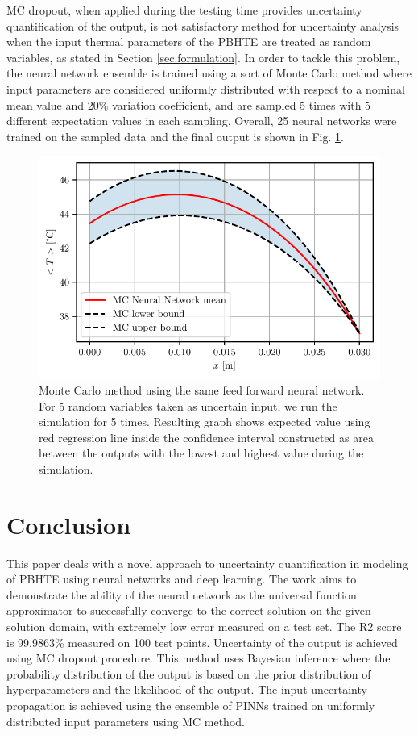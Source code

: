 \documentclass[conference]{IEEEtran}
\begin{document}
MC dropout, when applied during the testing time provides uncertainty quantification of the output, is not satisfactory method for uncertainty analysis when the input thermal parameters of the PBHTE are treated as random variables, as stated in Section \ref{sec.formulation}. In order to tackle this problem, the neural network ensemble is trained using a sort of Monte Carlo method where input parameters are considered uniformly distributed with respect to a nominal mean value and 20\% variation coefficient, and are sampled 5 times with 5 different expectation values in each sampling. Overall, 25 neural networks were trained on the sampled data and the final output is shown in Fig. \ref{fig.ensamble}.
\begin{figure}[]
\centering
 \includegraphics[width=\linewidth]{figs/uncertainty-mcnn-5epochs5samples.pdf}
\caption{Monte Carlo method using the same feed forward neural network. For 5 random variables taken as uncertain input, we run the simulation for 5 times. Resulting graph shows expected value using red regression line inside the confidence interval constructed as area between the outputs with the lowest and highest value during the simulation.}
\label{fig.ensamble}
\end{figure}

\section{Conclusion}
\label{sec.conclusion}
This paper deals with a novel approach to uncertainty quantification in modeling of PBHTE using neural networks and deep learning. The work aims to demonstrate the ability of the neural network as the universal function approximator to successfully converge to the correct solution on the given solution domain, with extremely low error measured on a test set. The R2 score is 99.9863\% measured on 100 test points. Uncertainty of the output is achieved using MC dropout procedure. This method uses Bayesian inference where the probability distribution of the output is based on the prior distribution of hyperparameters and the likelihood of the output. The input uncertainty propagation is achieved using the ensemble of PINNs trained on uniformly distributed input parameters using MC method.
\end{document}
